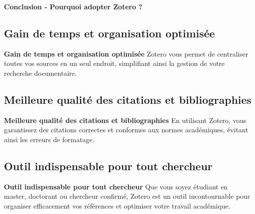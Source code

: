 \documentclass{beamer}
\begin{document}
\begin{frame}{\textbf{Conclusion - Pourquoi adopter Zotero ?}}

\subsection{Gain de temps et organisation optimisée}

\begin{block}{\textbf{Gain de temps et organisation optimisée}}
Zotero vous permet de centraliser toutes vos sources en un seul endroit, simplifiant ainsi la gestion de votre recherche documentaire.
\end{block}

\subsection{Meilleure qualité des citations et bibliographies}

\begin{block}{\textbf{Meilleure qualité des citations et bibliographies}}
En utilisant Zotero, vous garantissez des citations correctes et conformes aux normes académiques, évitant ainsi les erreurs de formatage.
\end{block}

\subsection{Outil indispensable pour tout chercheur}

\begin{block}{\textbf{Outil indispensable pour tout chercheur}}
Que vous soyez étudiant en master, doctorant ou chercheur confirmé, Zotero est un outil incontournable pour organiser efficacement vos références et optimiser votre travail académique.
\end{block}










\end{frame}
\end{document}
